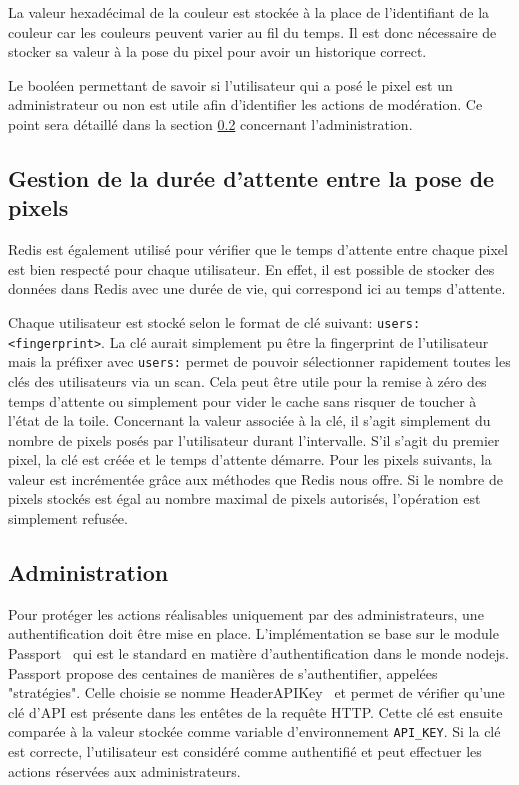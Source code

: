 La valeur hexadécimal de la couleur est stockée à la place de l'identifiant de la couleur car les couleurs peuvent varier au fil du temps. Il est donc nécessaire de stocker sa valeur à la pose du pixel pour avoir un historique correct.

Le booléen permettant de savoir si l'utilisateur qui a posé le pixel est un administrateur ou non est utile afin d'identifier les actions de modération. Ce point sera détaillé dans la section \ref{section:administration} concernant l'administration.

\subsection{Gestion de la durée d'attente entre la pose de pixels}

Redis est également utilisé pour vérifier que le temps d'attente entre chaque pixel est bien respecté pour chaque utilisateur. En effet, il est possible de stocker des données dans Redis avec une durée de vie, qui correspond ici au temps d'attente.

Chaque utilisateur est stocké selon le format de clé suivant: \texttt{users:<fingerprint>}. La clé aurait simplement pu être la fingerprint de l'utilisateur mais la préfixer avec \texttt{users:} permet de pouvoir sélectionner rapidement toutes les clés des utilisateurs via un scan. Cela peut être utile pour la remise à zéro des temps d'attente ou simplement pour vider le cache sans risquer de toucher à l'état de la toile. Concernant la valeur associée à la clé, il s'agit simplement du nombre de pixels posés par l'utilisateur durant l'intervalle. S'il s'agit du premier pixel, la clé est créée et le temps d'attente démarre. Pour les pixels suivants, la valeur est incrémentée grâce aux méthodes que Redis nous offre. Si le nombre de pixels stockés est égal au nombre maximal de pixels autorisés, l'opération est simplement refusée.

\subsection{Administration}
\label{section:administration}

Pour protéger les actions réalisables uniquement par des administrateurs, une authentification doit être mise en place. L'implémentation se base sur le module Passport~\cite{passport} qui est le standard en matière d'authentification dans le monde \gls{nodejs}. Passport propose des centaines de manières de s'authentifier, appelées "stratégies". Celle choisie se nomme HeaderAPIKey~\cite{passport-headerapikey} et permet de vérifier qu'une clé d'API est présente dans les entêtes de la requête HTTP. Cette clé est ensuite comparée à la valeur stockée comme variable d'environnement \texttt{API_KEY}. Si la clé est correcte, l'utilisateur est considéré comme authentifié et peut effectuer les actions réservées aux administrateurs.

